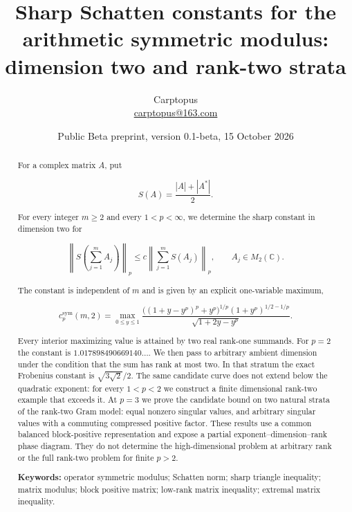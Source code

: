 \documentclass[11pt]{article}
\title{Sharp Schatten constants for the arithmetic symmetric modulus:\\dimension two and rank-two strata}
\author{Carptopus\\\href{mailto:carptopus@163.com}{carptopus@163.com}}
\date{Public Beta preprint, version 0.1-beta, 15 October 2026}
\begin{document}
\maketitle

\begin{center}
\end{center}

\begin{abstract}


For a complex matrix $A$, put

\[
S(A)=\frac{|A|+|A^*|}{2}.
\]

For every integer $m\ge2$ and every $1<p<\infty$, we determine the sharp constant
in dimension two for

\[
\left\|S\!\left(\sum_{j=1}^m A_j\right)\right\|_p
\le c\left\|\sum_{j=1}^m S(A_j)\right\|_p,
\qquad A_j\in M_2(\mathbb C).
\]

The constant is independent of $m$ and is given by an explicit one-variable maximum,

\[
c_p^{\mathrm{sym}}(m,2)=
\max_{0\le y\le1}
\frac{\bigl((1+y-y^p)^p+y^p\bigr)^{1/p}
(1+y^p)^{1/2-1/p}}
{\sqrt{1+2y-y^p}}.
\]

Every interior maximizing value is attained by two real rank-one summands. For $p=2$
the constant is $1.017898490669140\ldots$. We then pass to arbitrary ambient
dimension under the condition that the sum has rank at most two. In that stratum
the exact Frobenius constant is $\sqrt{3\sqrt2}/2$. The same candidate curve does
not extend below the quadratic exponent: for every $1<p<2$ we construct a finite
dimensional rank-two example that exceeds it. At $p=3$ we prove the candidate bound
on two natural strata of the rank-two Gram model: equal nonzero singular values,
and arbitrary singular values with a commuting compressed positive factor. These
results use a common balanced block-positive representation and expose a partial
exponent--dimension--rank phase diagram. They do not determine the high-dimensional
problem at arbitrary rank or the full rank-two problem for finite $p>2$.

\textbf{Keywords:} operator symmetric modulus; Schatten norm; sharp triangle inequality;
matrix modulus; block positive matrix; low-rank matrix inequality; extremal matrix
inequality.

\end{abstract}
\end{document}
